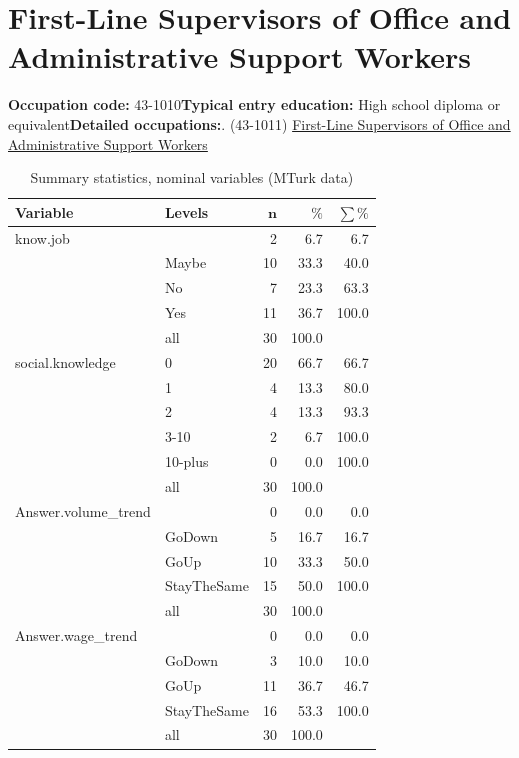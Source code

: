 \documentclass[a4paper,10pt]{article}\usepackage[]{graphicx}\usepackage[]{color}
\begin{document}
\newpage\section{First-Line Supervisors of Office and Administrative Support Workers}\textbf{Occupation code:} 43-1010\newline\textbf{Typical entry education:} High school diploma or equivalent\newline\textbf{Detailed occupations:}. (43-1011)  \href{http://www.bls.gov/oes/current/oes431011.htm}{First-Line Supervisors of Office and Administrative Support Workers}\newline%
\begin{table}[ht]
\centering
{\footnotesize
\begin{tabular}{ll|rrr}
 \textbf{Variable} & \textbf{Levels} & $\mathbf{n}$ & $\mathbf{\%}$ & $\mathbf{\sum \%}$ \\ 
  \hline
know.job &  & 2 & 6.7 & 6.7 \\ 
   & Maybe & 10 & 33.3 & 40.0 \\ 
   & No & 7 & 23.3 & 63.3 \\ 
   & Yes & 11 & 36.7 & 100.0 \\ 
   \hline
 & all & 30 & 100.0 &  \\ 
   \hline
\hline
social.knowledge & 0 & 20 & 66.7 & 66.7 \\ 
   & 1 & 4 & 13.3 & 80.0 \\ 
   & 2 & 4 & 13.3 & 93.3 \\ 
   & 3-10 & 2 & 6.7 & 100.0 \\ 
   & 10-plus & 0 & 0.0 & 100.0 \\ 
   \hline
 & all & 30 & 100.0 &  \\ 
   \hline
\hline
Answer.volume\_trend &  & 0 & 0.0 & 0.0 \\ 
   & GoDown & 5 & 16.7 & 16.7 \\ 
   & GoUp & 10 & 33.3 & 50.0 \\ 
   & StayTheSame & 15 & 50.0 & 100.0 \\ 
   \hline
 & all & 30 & 100.0 &  \\ 
   \hline
\hline
Answer.wage\_trend &  & 0 & 0.0 & 0.0 \\ 
   & GoDown & 3 & 10.0 & 10.0 \\ 
   & GoUp & 11 & 36.7 & 46.7 \\ 
   & StayTheSame & 16 & 53.3 & 100.0 \\ 
   \hline
 & all & 30 & 100.0 &  \\ 
   \hline
\hline
\end{tabular}
}
\caption{Summary statistics, nominal variables (MTurk data)} 
\label{tab1:43-1010}
\end{table}
\end{document}
